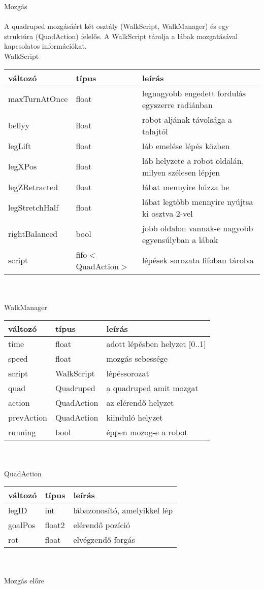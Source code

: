 \documentclass{article}
\begin{document}
	
Mozgás\\\\
A quadruped mozgásáért két osztály (WalkScript, WalkManager) és egy struktúra (QuadAction) felelős. A WalkScript tárolja a lábak mozgatásával kapcsolatos információkat.\\

WalkScript\\
\begin{tabular}{| l | l | l |}
\hline
változó&típus&leírás\\
\hline
maxTurnAtOnce&float&legnagyobb engedett fordulás egyszerre radiánban\\
\hline
bellyy&float&robot aljának távolsága a talajtól\\
\hline
legLift&float&láb emelése lépés közben\\
\hline
legXPos&float&láb helyzete a robot oldalán, milyen szélesen lépjen\\
\hline
legZRetracted&float&lábat mennyire húzza be\\
\hline
legStretchHalf&float&lábat legtöbb mennyire nyújtsa ki osztva 2-vel\\
\hline
rightBalanced&bool&jobb oldalon vannak-e nagyobb egyensúlyban a lábak\\
\hline
script&fifo$<$QuadAction$>$&lépések sorozata fifoban tárolva\\
\hline
\end{tabular}\\
\\

WalkManager\\
\begin{tabular}{| l | l | l |}
	\hline
	változó&típus&leírás\\
	\hline
	time&float&adott lépésben helyzet [0..1]\\
	\hline
	speed&float&mozgás sebessége\\
	\hline
	script&WalkScript&lépéssorozat\\
	\hline
	quad&Quadruped&a quadruped amit mozgat\\
	\hline
	action&QuadAction&az elérendő helyzet\\
	\hline
	prevAction&QuadAction&kiinduló helyzet\\
	\hline
	running&bool&éppen mozog-e a robot\\
	\hline
\end{tabular}\\
\\

QuadAction\\
\begin{tabular}{| l | l | l |}
	\hline
	változó&típus&leírás\\
	\hline
	legID&int&lábazonosító, amelyikkel lép\\
	\hline
	goalPos&float2&elérendő pozíció\\
	\hline
	rot&float&elvégzendő forgás\\
	\hline
\end{tabular}\\\\

Mozgás előre

	
\end{document}
